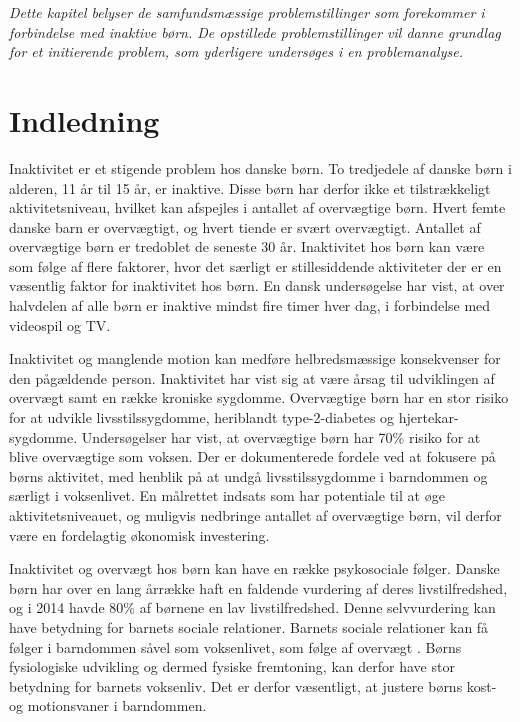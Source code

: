 \textit{Dette kapitel belyser de samfundsmæssige problemstillinger som forekommer i forbindelse med inaktive børn. De opstillede problemstillinger vil danne grundlag for et initierende problem, som yderligere undersøges i en problemanalyse.}

\section{Indledning}
Inaktivitet er et stigende problem hos danske børn. To tredjedele af danske børn i alderen, 11 år til 15 år, er inaktive\citep{SundhedsstyrrelsenFaktaark}. Disse børn har derfor ikke et tilstrækkeligt aktivitetsniveau, hvilket kan  afspejles i antallet af overvægtige børn. Hvert femte danske barn er overvægtigt, og hvert tiende er svært overvægtigt.\citep{Universitet2014} Antallet af overvægtige børn er tredoblet de seneste 30 år\citep{Vindum2012}. Inaktivitet hos børn kan være som følge af flere faktorer, hvor det særligt er stillesiddende aktiviteter der er en væsentlig faktor for inaktivitet hos børn. En dansk undersøgelse har vist, at over halvdelen af alle børn er inaktive mindst fire timer hver dag, i forbindelse med videospil og TV\citep{Universitet2014}. 

Inaktivitet og manglende motion kan medføre helbredsmæssige konsekvenser for den pågældende person. Inaktivitet har vist sig at være årsag til udviklingen af overvægt samt en række kroniske sygdomme. Overvægtige børn har en stor risiko for at udvikle livsstilssygdomme, heriblandt type-2-diabetes og hjertekar-sygdomme. Undersøgelser har vist, at overvægtige børn har 70\% risiko for at blive overvægtige som voksen.\citep{Reilly2006} Der er dokumenterede fordele ved at fokusere på børns aktivitet, med henblik på at undgå livsstilssygdomme i barndommen og særligt i voksenlivet. En målrettet indsats som har potentiale til at øge aktivitetsniveauet, og muligvis nedbringe antallet af overvægtige børn, vil derfor være en fordelagtig økonomisk investering\citep{COWI2015}.

Inaktivitet og overvægt hos børn kan have en række psykosociale følger. Danske børn har over en lang årrække haft en faldende vurdering af deres livstilfredshed, og i 2014 havde 80\% af børnene en lav livstilfredshed\citep{Universitet2014}. Denne selvvurdering kan have betydning for barnets sociale relationer. Barnets sociale relationer kan få følger i barndommen såvel som voksenlivet, som følge af overvægt \citep{StatensInstitutforFolkesundhed2007}. \newline
Børns fysiologiske udvikling og dermed fysiske fremtoning, kan derfor have stor betydning for barnets voksenliv. Det er derfor væsentligt, at justere børns kost- og motionsvaner i barndommen. \newpage

